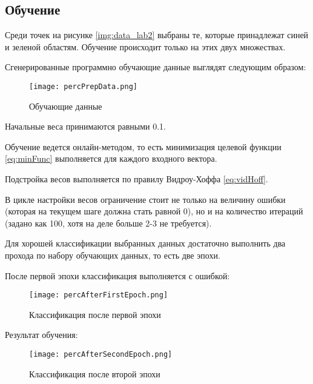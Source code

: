 \subsection{Обучение}

Среди точек на рисунке \ref{img:data_lab2} выбраны те, которые принадлежат синей и зеленой областям. Обучение происходит только на этих двух множествах.

Сгенерированные программно обучающие данные выглядят следующим образом:

\begin{figure}[H]
\centering
\texttt{[image: percPrepData.png]}
\caption{Обучающие данные}
\label{img:}
\end{figure}

Начальные веса принимаются равными 0.1.

Обучение ведется онлайн-методом, то есть минимизация целевой функции \eqref{eq:minFunc} выполняется для каждого входного вектора.

Подстройка весов выполняется по правилу Видроу-Хоффа \eqref{eq:vidHoff}.

В цикле настройки весов ограничение стоит не только на величину ошибки (которая на текущем шаге должна стать равной 0), но и на количество итераций (задано как 100, хотя на деле больше 2-3 не требуется).

Для хорошей классификации выбранных данных достаточно выполнить два прохода по набору обучающих данных, то есть две эпохи.

После первой эпохи классификация выполняется с ошибкой:

\begin{figure}[H]
\centering
\texttt{[image: percAfterFirstEpoch.png]}
\caption{Классификация после первой эпохи}
\label{img:}
\end{figure}

Результат обучения:

\begin{figure}[H]
\centering
\texttt{[image: percAfterSecondEpoch.png]}
\caption{Классификация после второй эпохи}
\label{img:}
\end{figure}

